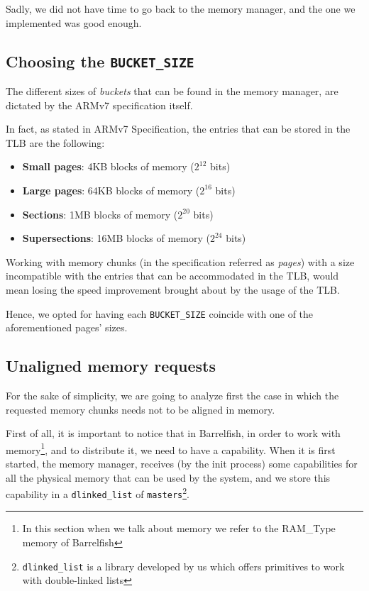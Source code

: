 \documentclass[a4paper,twoside,openright]{report}
\begin{document}
Sadly, we did not have time to go back to the memory manager, and the one we implemented was good enough.

\subsection{Choosing the \texttt{BUCKET\_SIZE}}
The different sizes of \emph{buckets} that can be found in the memory manager, are dictated by the ARMv7 specification itself.

In fact, as stated in ARMv7 Specification\cite{arm_docs}, the entries that can be stored in the TLB are the following:
\begin{itemize}
    \item \textbf{Small pages}: 4KB blocks of memory ($2^{12}$ bits)
    \item \textbf{Large pages}: 64KB blocks of memory ($2^{16}$ bits)
    \item \textbf{Sections}: 1MB blocks of memory ($2^{20}$ bits)
    \item \textbf{Supersections}: 16MB blocks of memory ($2^{24}$ bits)
\end{itemize}
Working with memory chunks (in the specification referred as \textit{pages}) with a size incompatible with the entries that can be accommodated in the TLB, would mean losing the speed improvement brought about by the usage of the TLB.

Hence, we opted for having each \texttt{BUCKET\_SIZE} coincide with one of the aforementioned pages' sizes.

\subsection{Unaligned memory requests}
For the sake of simplicity, we are going to analyze first the case in which the requested memory chunks needs not to be aligned in memory.

First of all, it is important to notice that in Barrelfish, in order to work with memory\footnote{In this section when we talk about memory we refer to the RAM\_Type memory of Barrelfish}, and to distribute it, we need to have a capability.
When it is first started, the memory manager, receives (by the init process) some capabilities for all the physical memory that can be used by the system, and we store this capability in a \texttt{dlinked\_list} of \texttt{masters}\footnote{\texttt{dlinked\_list} is a library developed by us which offers primitives to work with double-linked lists}.
\end{document}
